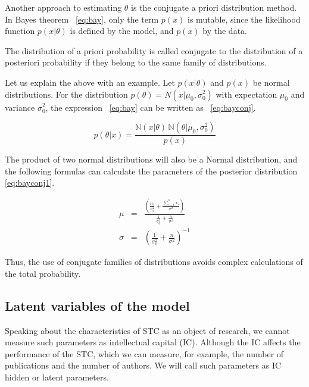 \documentclass[12pt]{report}
\theoremstyle{definition}
\begin{document}
Another approach to estimating $\theta$ is the conjugate a priori distribution method. 
In Bayes theorem ~\ref{eq:bay}, only the term $p \left( x \right)$ is mutable, since the likelihood function $p \left( x \vert \theta \right)$ is defined by the model, and $p \left( x \right)$ by the data.

The distribution of a priori probability is called conjugate to the distribution of a posteriori probability if they belong to the same family of distributions. 

Let us explain the above with an example.
Let $p \left( x \vert \theta \right)$ and $p \left( x \right)$ be normal distributions.
For the distribution $p \left( \theta \right) = N (x \vert \mu_0,\sigma_0^2)$ with expectation $\mu_0$ and variance $\sigma_0^2$, the expression ~\ref{eq:bay} can be written as ~\ref{eq:bayconj}.

\begin{equation} \label{eq:bayconj}
p \left( \theta \vert  x \right) = \frac{\mathbb{N} \left( x \vert \theta \right) \, \mathbb{N}(\theta \vert \mu_0,\sigma_0^2)} {p \left(  x \right)}
\end{equation}

The product of two normal distributions will also be a Normal distribution, and the following formulas can calculate the parameters of the posterior distribution \ref{eq:bayconj1}.

\begin{eqnarray}
\label{eq:bayconj1}
\mu & = & \frac{\left( \frac{\mu_0}{\sigma_0^2} + \frac{\sum_{i=1}^n x_i}{\sigma^2}\right)} { \frac{1}{\sigma_0^2}+ \frac{n}{\sigma^2} }\\
\sigma & = & \left( \frac{1}{\sigma_0^2} + \frac{n}{\sigma^2}\right)^{-1}
\end{eqnarray}

Thus, the use of conjugate families of distributions avoids complex calculations of the total probability.	

\subsection{Latent variables of the model}

Speaking about the characteristics of STC  as an object of research, we cannot measure such parameters as intellectual capital (IC).
Although the IC affects the performance of the STC, which we can measure, for example, the number of publications and the number of authors.
We will call such parameters as IC hidden or latent parameters.
\end{document}

